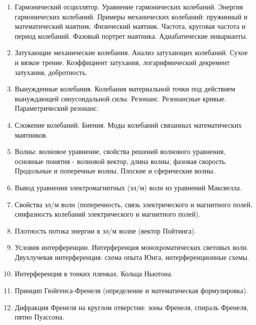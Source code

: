 \documentclass[12pt]{article}
\begin{document}
\begin{enumerate}

    \item Гармонический осциллятор. Уравнение гармонических колебаний. Энергия гармонических колебаний. Примеры механических колебаний: пружинный и математический маятник. Физический маятник. Частота, круговая частота и период колебаний. Фазовый портрет маятника. Адиабатические инварианты.

    \item Затухающие механические колебания. Анализ затухающих колебаний. Сухое и вязкое трение. Коэффициент затухания, логарифмический декремент затухания, добротность.

    \item Вынужденные колебания. Колебания материальной точки под действием вынуждающей синусоидальной силы. Резонанс. Резонансные кривые. Параметрический резонанс.

    \item Сложение колебаний. Биения. Моды колебаний связанных математических маятников.

    \item Волны: волновое уравнение, свойства решений волнового уравнения, основные понятия - волновой вектор, длина волны, фазовая скорость. Продольные и поперечные волны. Плоские и сферические волны.

    \item Вывод уравнения электромагнитных (эл/м) волн из уравнений Максвелла.

    \item Свойства эл/м волн (поперечность, связь электрического и магнитного полей, синфазность колебаний электрического и магнитного полей).

    \item Плотность потока энергии в эл/м волне (вектор Пойтинга).

    \item Условия интерференции. Интерференция монохроматических световых волн. Двухлучевая интерференция: схема опыта Юнга, интерференционные схемы.

    \item Интерференция в тонких пленках. Кольца Ньютона.

    \item Принцип Гюйгенса-Френеля (определение и математическая формулировка).

    \item Дифракция Френеля на круглом отверстии: зоны Френеля, спираль Френеля, пятно Пуассона.


\end{enumerate}
\end{document}
